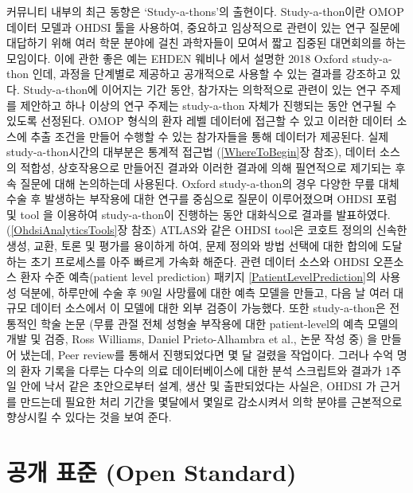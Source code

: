 \documentclass[11pt]{book}
\theoremstyle{definition}
\theoremstyle{definition}
\theoremstyle{definition}
\theoremstyle{remark}
\begin{document}
커뮤니티 내부의 최근 동향은 `Study-a-thons'의 출현이다. Study-a-thon이란
OMOP 데이터 모델과 OHDSI 툴을 사용하여, 중요하고 임상적으로 관련이 있는
연구 질문에 대답하기 위해 여러 학문 분야에 걸친 과학자들이 모여서 짧고
집중된 대면회의를 하는 모임이다. 이에 관한 좋은 예는 EHDEN 웨비나 에서
설명한 2018 Oxford study-a-thon 인데, 과정을 단계별로 제공하고
공개적으로 사용할 수 있는 결과를 강조하고 있다. Study-a-thon에 이어지는
기간 동안, 참가자는 의학적으로 관련이 있는 연구 주제를 제안하고 하나
이상의 연구 주제는 study-a-thon 자체가 진행되는 동안 연구될 수 있도록
선정된다. OMOP 형식의 환자 레벨 데이터에 접근할 수 있고 이러한 데이터
소스에 추출 조건을 만들어 수행할 수 있는 참가자들을 통해 데이터가
제공된다. 실제 study-a-thon시간의 대부분은 통계적 접근법
(\ref{WhereToBegin}장 참조), 데이터 소스의 적합성, 상호작용으로 만들어진
결과와 이러한 결과에 의해 필연적으로 제기되는 후속 질문에 대해
논의하는데 사용된다. Oxford study-a-thon의 경우 다양한 무릎 대체 수술 후
발생하는 부작용에 대한 연구를 중심으로 질문이 이루어졌으며 OHDSI 포럼 및
tool 을 이용하여 study-a-thon이 진행하는 동안 대화식으로 결과를
발표하였다. (\ref{OhdsiAnalyticsTools}장 참조) ATLAS와 같은 OHDSI tool은
코호트 정의의 신속한 생성, 교환, 토론 및 평가를 용이하게 하여, 문제
정의와 방법 선택에 대한 합의에 도달하는 초기 프로세스를 아주 빠르게
가속화 해준다. 관련 데이터 소스와 OHDSI 오픈소스 환자 수준 예측(patient
level prediction) 패키지 \ref{PatientLevelPrediction}의 사용성 덕분에,
하루만에 수술 후 90일 사망률에 대한 예측 모델을 만들고, 다음 날 여러
대규모 데이터 소스에서 이 모델에 대한 외부 검증이 가능했다. 또한
study-a-thon은 전통적인 학술 논문 (무릎 관절 전체 성형술 부작용에 대한
patient-level의 예측 모델의 개발 및 검증, Ross Williams, Daniel
Prieto-Alhambra et al., 논문 작성 중) 을 만들어 냈는데, Peer review를
통해서 진행되었다면 몇 달 걸렸을 작업이다. 그러나 수억 명의 환자 기록을
다루는 다수의 의료 데이터베이스에 대한 분석 스크립트와 결과가 1주일 안에
낙서 같은 초안으로부터 설계, 생산 및 출판되었다는 사실은, OHDSI 가
근거를 만드는데 필요한 처리 기간을 몇달에서 몇일로 감소시켜서 의학
분야를 근본적으로 향상시킬 수 있다는 것을 보여 준다.

\section{공개 표준 (Open Standard)}\label{--open-standard}

\end{document}
